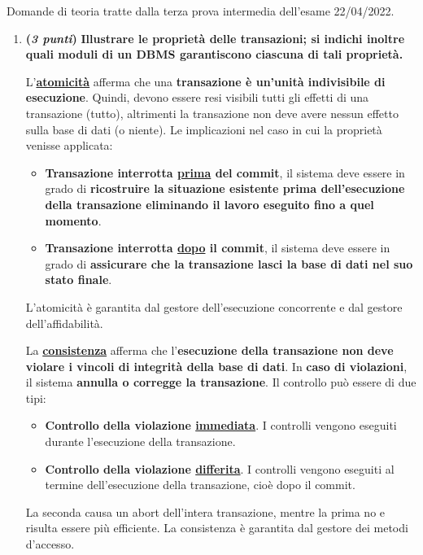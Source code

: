 \documentclass[a4paper]{article}
\begin{document}
	Domande di teoria tratte dalla terza prova intermedia dell'esame 22/04/2022.
	\begin{enumerate}
		\item \textbf{(\emph{3 punti})} \textcolor{Green4}{\textbf{Illustrare le proprietà delle transazioni; si indichi inoltre quali moduli di un DBMS garantiscono ciascuna di tali proprietà.}}\label{dom: proprietà delle transazioni}
		
		L'\textbf{\underline{atomicità}} afferma che una \textbf{transazione è un'unità indivisibile di esecuzione}. Quindi, devono essere resi visibili tutti gli effetti di una transazione (tutto), altrimenti la transazione non deve avere nessun effetto sulla base di dati (o niente). Le implicazioni nel caso in cui la proprietà venisse applicata:
		\begin{itemize}
			\item \textbf{Transazione interrotta \underline{prima} del commit}, il sistema deve essere in grado di \textbf{ricostruire la situazione esistente prima dell'esecuzione della transazione eliminando il lavoro eseguito fino a quel momento}.
			
			\item \textbf{Transazione interrotta \underline{dopo} il commit}, il sistema deve essere in grado di \textbf{assicurare che la transazione lasci la base di dati nel suo stato finale}.
		\end{itemize}
		L'atomicità è garantita dal gestore dell'esecuzione concorrente e dal gestore dell'affidabilità.\newline
		
		La \textbf{\underline{consistenza}} afferma che l'\textbf{esecuzione della transazione non deve violare i vincoli di integrità della base di dati}. In \textbf{caso di violazioni}, il sistema \textbf{annulla o corregge la transazione}. Il controllo può essere di due tipi:
		\begin{itemize}
			\item \textbf{Controllo della violazione \underline{immediata}}. I controlli vengono eseguiti durante l'esecuzione della transazione.
			
			\item \textbf{Controllo della violazione \underline{differita}}. I controlli vengono eseguiti al termine dell'esecuzione della transazione, cioè dopo il \textsf{commit}.
		\end{itemize}
		La seconda causa un \textsf{abort} dell'intera transazione, mentre la prima no e risulta essere più efficiente. La consistenza è garantita dal gestore dei metodi d'accesso.\newline
		

\end{enumerate}
\end{document}
